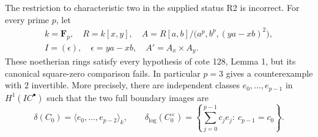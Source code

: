 \begin{proposition}
\label{A4:all-primes}
The restriction to characteristic two in the supplied status R2 is
incorrect.  For every prime $p$, let
\[
\begin{gathered}
 k=\mathbf F_p,\quad R=k[x,y],\quad
 A=R[a,b]/\bigl(a^p,b^p,(ya-xb)^2\bigr),\\
 I=(\epsilon),\quad\epsilon=ya-xb,\quad A'=A_x\times A_y.
\end{gathered}
\]
These noetherian rings satisfy every hypothesis of cote 128, Lemma 1,
but its canonical square-zero comparison fails.  In particular $p=3$
gives a counterexample with $2$ invertible.  More precisely, there are
independent classes $e_0,\ldots,e_{p-1}$ in $H^1(IC^\bullet)$ such that
the two full boundary images are
\[
 \delta(C_0)=\langle e_0,\ldots,e_{p-2}\rangle_k,
 \qquad
 \delta_{\log}(C_0^\times)
 =\left\{\sum_{j=0}^{p-1}c_je_j:\ c_{p-1}=c_0\right\}.
\]
\end{proposition}
